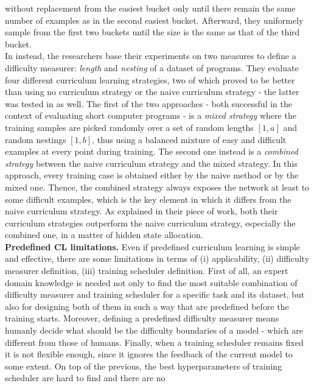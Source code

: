without replacement from the easiest bucket only until there remain the same number of 
examples as in the second easiest bucket. Afterward, they uniformely sample 
from the first two buckets until the size is the same as that of the third bucket.\\
In \cite{zaremba2014learning} instead, the researchers base their experiments on two measures to 
define a difficulty measurer: \textit{length} and \textit{nesting} of a dataset of programs.
They evaluate four different curriculum learning strategies, two of which proved to be better than using no curriculum strategy or the 
naive curriculum strategy - the latter was tested in \cite{bengio2009curriculum} as well.
The first of the two approaches - both successful in the context of evaluating 
short computer programs - is a \textit{mixed strategy} where the training samples
are picked randomly over a set of random lengths \([1, a]\) and random nestings \([1, b]\),
thus using a balanced mixture of easy and difficult examples at every point during training.
The second one instead is a \textit{combined strategy} between the naive curriculum strategy 
and the mixed strategy. In this approach, every training case is obtained 
either by the naive method or by the mixed one. 
Thence, the combined strategy always exposes the network at least to some difficult examples, which is the key element 
in which it differs from the naive curriculum strategy. As explained in their 
piece of work, both their curriculum strategies outperform the naive curriculum strategy, especially 
the combined one, in a matter of hidden state allocation.\\
\textbf{Predefined CL limitations.} Even if predefined curriculum learning is simple and effective, there are 
some limitations in terms of (i) applicability, (ii) difficulty measurer definition, (iii) training scheduler definition.
First of all, an expert domain knowledge is needed not only to find the most suitable
combination of difficulty measurer and training scheduler for a specific task and its dataset, 
but also for designing both of them in such a way that are predefined before the training starts.
Moreover, defining a predefined difficulty measurer means humanly decide what should be the difficulty boundaries of a model - which are
different from those of humans. Finally, when a training scheduler remains fixed 
it is not flexible enough, since it ignores the feedback of the current model to some extent.
On top of the previous, the best hyperparameters of training scheduler are hard to find and there are no 
